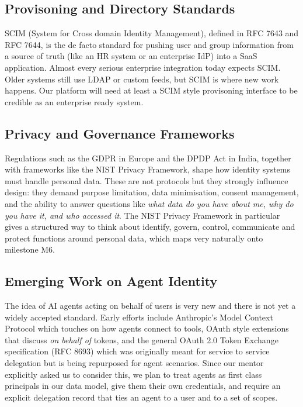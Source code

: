 \documentclass[11pt,a4paper]{article}
\begin{document}
\subsection{Provisoning and Directory Standards}

SCIM (System for Cross domain Identity Management), defined in RFC 7643 and RFC 7644, is the de facto standard for pushing user and group information from a source of truth (like an HR system or an enterprise IdP) into a SaaS application. Almost every serious enterprise integration today expects SCIM. Older systems still use LDAP or custom feeds, but SCIM is where new work happens. Our platform will need at least a SCIM style provisoning interface to be credible as an enterprise ready system.

\subsection{Privacy and Governance Frameworks}

Regulations such as the GDPR in Europe and the DPDP Act in India, together with frameworks like the NIST Privacy Framework, shape how identity systems must handle personal data. These are not protocols but they strongly influence design: they demand purpose limitation, data minimisation, consent management, and the ability to answer questions like \textit{what data do you have about me, why do you have it, and who accessed it}. The NIST Privacy Framework in particular gives a structured way to think about identify, govern, control, communicate and protect functions around personal data, which maps very naturally onto milestone M6.

\subsection{Emerging Work on Agent Identity}

The idea of AI agents acting on behalf of users is very new and there is not yet a widely accepted standard. Early efforts include Anthropic's Model Context Protocol which touches on how agents connect to tools, OAuth style extensions that discuss \textit{on behalf of} tokens, and the general OAuth 2.0 Token Exchange specification (RFC 8693) which was originally meant for service to service delegation but is being repurposed for agent scenarios. Since our mentor explicitly asked us to consider this, we plan to treat agents as first class principals in our data model, give them their own credentials, and require an explicit delegation record that ties an agent to a user and to a set of scopes.
\end{document}
